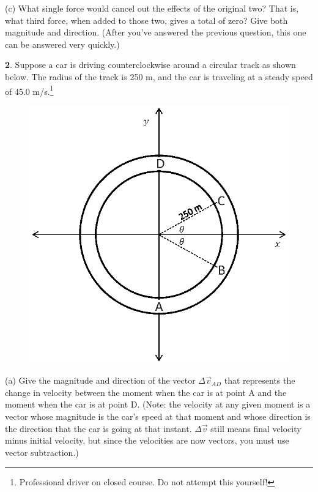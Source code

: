 \vfil\vfil

(c) What single force would cancel out the effects of the original two?  That
is, what third force, when added to those two, gives a total of zero?
Give both magnitude and direction.  (After you've answered the
previous question, this one can be answered very quickly.)

\vfil\eject


{\bf 2}.  Suppose a car is driving counterclockwise around a circular track as shown
below.  The radius of the track is 250 m, and the car is traveling
at a steady speed of 45.0 m/s.\footnote{Professional driver on closed
course.  Do not attempt this yourself!}

\begin{figure}[h]
\centerline{\includegraphics{vectors/vectors_fig_new.eps}}
\end{figure}

(a) Give the magnitude and direction of the vector $\Delta{\vec v}_{AD}$
that represents the change in velocity between the moment when the
car is at point A and the moment when the car is at point D.  (Note:
the velocity at any given moment is a vector whose magnitude is the
car's speed at that moment and whose direction is the direction that
the car is going at that instant.  $\Delta{\vec v}$ still means
final velocity minus initial velocity, but since the velocities are
now vectors, you must use vector subtraction.)

